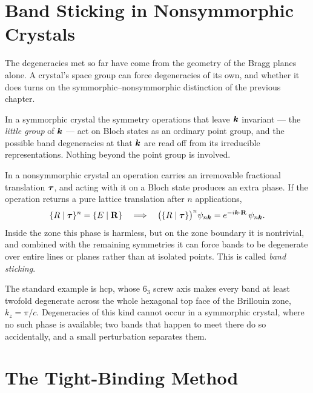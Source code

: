 \section{Band Sticking in Nonsymmorphic Crystals}
\label{sec:bloch-sticking}

The degeneracies met so far have come from the geometry of the Bragg planes alone. A crystal's space group can force degeneracies of its own, and whether it does turns on the symmorphic--nonsymmorphic distinction of the previous chapter.

In a symmorphic crystal the symmetry operations that leave $\bm{k}$ invariant --- the \emph{little group} of $\bm{k}$ --- act on Bloch states as an ordinary point group, and the possible band degeneracies at that $\bm{k}$ are read off from its irreducible representations. Nothing beyond the point group is involved.

In a nonsymmorphic crystal an operation carries an irremovable fractional translation $\bm{\tau}$, and acting with it on a Bloch state produces an extra phase. If the operation returns a pure lattice translation after $n$ applications,
\begin{equation}
    \{R \mid \lvect{\tau}\}^n = \{E \mid \cvect{R}\}
    \quad\Longrightarrow\quad
    \bigl(\{R \mid \lvect{\tau}\}\bigr)^n \psi_{n\lvect{k}} = e^{-i\lvect{k}\cdot\cvect{R}}\,\psi_{n\lvect{k}} .
\end{equation}
Inside the zone this phase is harmless, but on the zone boundary it is nontrivial, and combined with the remaining symmetries it can force bands to be degenerate over entire lines or planes rather than at isolated points. This is called \emph{band sticking}.

The standard example is hcp, whose $6_3$ screw axis makes every band at least twofold degenerate across the whole hexagonal top face of the Brillouin zone, $k_z = \pi/c$. Degeneracies of this kind cannot occur in a symmorphic crystal, where no such phase is available; two bands that happen to meet there do so accidentally, and a small perturbation separates them.

\section{The Tight-Binding Method}

